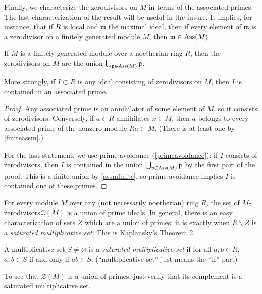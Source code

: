 Finally, we characterize the zerodivisors on $M$ in terms of the associated
primes. The last characterization of the result will be useful in the future.
It implies, for instance, that if $R$ is local and $\mathfrak{m}$ the maximal
ideal, then if every element of $\mathfrak{m}$ is a zerodivisor on a finitely
generated module
$M$, then $\mathfrak{m} \in \operatorname{Ass}(M)$.

\begin{proposition} \label{assmdichotomy}
If $M$ is a finitely generated module over a noetherian ring $R$, then the
zerodivisors on $M$ are the union $\bigcup_{\mathfrak{p} \in \operatorname{Ass}(M)}
\mathfrak{p}$.

More strongly, if $I \subset R$ is any ideal consisting of zerodivisors on
$M$, then $I$ is contained in an associated prime.
\end{proposition} 
\begin{proof} 
Any associated prime is an annihilator of some element of $M$, so it consists
of zerodivisors. Conversely, if $a \in R$ annihilates $x \in M$, then $a$
belongs to every associated prime of the nonzero module $Ra \subset M$. (There
is at least one by \cref{finiteassm}.)

For the last statement, we use prime avoidance (\cref{primeavoidance}): if $I$ consists of
zerodivisors, then $I$ is contained in the union $\bigcup_{\mathfrak{p} \in \operatorname{Ass}(M)}
\mathfrak{p}$ by the first part of the proof. This is a finite union by
\cref{assmfinite}, so prime avoidance implies $I$ is contained one of these
primes.
\end{proof} 


\begin{exercise} 
For every module $M$ over any (not necessarily noetherian) ring $R$,
the set of $M$-zerodivisors$\mathcal{Z}(M)$ is a union of prime ideals. In general, there is an easy
 characterization of sets $Z$ which are a union of primes: it is exactly when
 $R\smallsetminus Z$ is a \emph{saturated multiplicative set}. This is Kaplansky's
 Theorem 2.
 \begin{definition}
   A multiplicative set $S\neq \varnothing$ is a \emph{saturated multiplicative set} if
   for all $a,b\in R$, $a,b\in S$ if and only if $ab\in S$. (``multiplicative set'' just
   means the ``if'' part)
 \end{definition}
 To see that $\mathcal{Z}(M)$ is a union of primes, just verify that its complement is a saturated
 multiplicative set.
\end{exercise}

